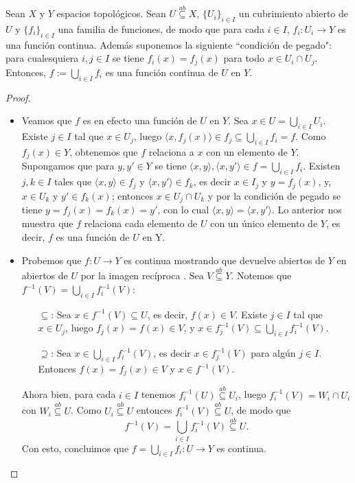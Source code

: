 \begin{Tma}\label{Tma:lemaPegado}
   Sean $X$ y $Y$ espacios topológicos. Sean $U\stackrel{ab}\subseteq X$, $\{U_i\}_{i\in I}$ un cubrimiento abierto de $U$ y $\{f_i\}_{i\in I}$ una familia de funciones, de modo que para cada $i\in I$, $f_i:U_i\to Y$ es una función continua. Además suponemos la siguiente ``condición de pegado": para cualesquiera $i,j\in I$ se tiene $f_i(x)=f_j(x)$ para todo $x\in U_i \cap U_j$. Entonces, $f:=\bigcup_{i\in I}f_i$ es una función continua de $U$ en $Y$.
\end{Tma}
\begin{proof}
   \begin{itemize}
      \item Veamos que $f$ es en efecto una función de $U$ en $Y$. Sea $x\in U=\bigcup_{i\in I} U_i$. Existe $j\in I$ tal que $x\in U_j$, luego $\langle x,f_j(x)\rangle\in f_j \subseteq \bigcup_{i\in I} f_i =f$. Como $f_j(x)\in Y$, obtenemos que $f$ relaciona a $x$ con un elemento de $Y$. Supongamos que para $y,y'\in Y$ se tiene $\langle x,y\rangle, \langle x,y'\rangle\in f=\bigcup_{i\in I}f_i$. Existen $j,k\in I$ tales que $\langle x,y\rangle\in f_j$ y $\langle x,y'\rangle\in f_k$, es decir $x\in I_j$ y $y=f_j(x)$, y, $x\in U_k$ y $y'\in f_k(x)$; entonces $x\in U_j\cap U_k$ y por la condición de pegado se tiene $y=f_j(x)=f_k(x)=y'$, con lo cual $\langle x,y\rangle=\langle x,y'\rangle$. Lo anterior nos muestra que $f$ relaciona cada elemento de $U$ con un único elemento de $Y$, es decir, $f$ es una función de $U$ en Y.
      \item Probemos que $f:U\to Y$ es continua mostrando que devuelve abiertos de $Y$ en abiertos de $U$ por la imagen recíproca . Sea $V\stackrel{ab}\subseteq Y$. Notemos que $f^{-1}(V)=\bigcup_{i\in I} f_i^{-1}(V)$:
         \begin{itemize}
            \item[$\subseteq$:] Sea $x\in f^{-1}(V)\subseteq U$, es decir, $f(x)\in V$. Existe $j\in I$ tal que $x\in U_j$, luego $f_j(x)=f(x)\in V$, y $x\in f_j^{-1}(V)\subseteq\bigcup_{i\in I}f_i^{-1}(V)$. 
            \item[$\supseteq$:] Sea $x\in\bigcup_{i\in I} f_i^{-1}(V)$, es decir $x\in f_j^{-1}(V)$ para algún $j\in I$. Entonces $f(x)=f_j(x)\in V$ y $x\in f^{-1}(V)$.
         \end{itemize}
         Ahora bien, para cada $i\in I$ tenemos $f_i^{-1}(U)\stackrel{ab}\subseteq U_i$, luego $f_i^{-1}(V)=W_i\cap U_i$ con $W_i\stackrel{ab}\subseteq U$. Como $U_i \stackrel{ab}\subseteq U$ entonces $f_i^{-1}(V) \stackrel{ab}\subseteq U$, de modo que
         $$
         f^{-1}(V)=\bigcup_{i\in I}f_i^{-1}(V) \stackrel{ab}\subseteq U. 
         $$
         Con esto, concluimos que $f=\bigcup_{i\in I}f_i:U\to  Y$ es continua.
   \end{itemize}
\end{proof}
